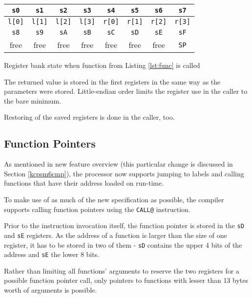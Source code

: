         \begin{listing}
        \centering
        \begin{tabular}{ | c | c | c | c | c | c | c | c | }
            \hline
            \texttt{s0} & \texttt{s1} & \texttt{s2} & \texttt{s3} & \texttt{s4} & \texttt{s5} & \texttt{s6} & \texttt{s7} \\
            \hline
            \texttt{l[0]} & \texttt{l[1]} & \texttt{l[2]} & \texttt{l[3]} & \texttt{r[0]} & \texttt{r[1]} & \texttt{r[2]} & \texttt{r[3]} \\
            \hline
            \hline
            \texttt{s8} & \texttt{s9} & \texttt{sA} & \texttt{sB} & \texttt{sC} & \texttt{sD} & \texttt{sE} & \texttt{sF} \\
            \hline
            free & free & free & free & free & free & free & \texttt{SP} \\
            \hline
        \end{tabular}
        \caption{Register bank state when function from Listing \ref{lst:func} is called}\label{lst:regs}
        \end{listing}

        The returned value is stored in the first registers in the same way as the parameters were stored. Little-endian order limits the register use in the caller to the bare minimum.

        Restoring of the saved registers is done in the caller, too.

        \subsection{Function Pointers}

        As mentioned in new feature overview (this particular change is discussed in Section \ref{kcpsm6cmp}), the processor now supports jumping to labels and calling functions that have their address loaded on run-time.

        To make use of as much of the new specification as possible, the compiler supports calling function pointers using the \texttt{CALL@} instruction.

        Prior to the instruction invocation itself, the function pointer is stored in the \texttt{sD} and \texttt{sE} registers. As the address of a function is larger than the size of one register, it has to be stored in two of them - \texttt{sD} contains the upper 4 bits of the address and \texttt{sE} the lower 8 bits.

        Rather than limiting all functions' arguments to reserve the two registers for a possible function pointer call, only pointers to functions with lesser than 13 bytes worth of arguments is possible.

